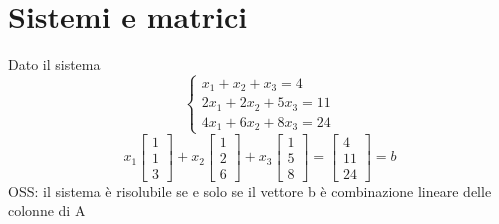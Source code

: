 \documentclass[12pt,a4paper,oneside]{article}
\begin{document}
\section{Sistemi e matrici}
\label{sec:sistemiematrici}

Dato il sistema
\[
	\begin{cases}
		x_1 + x_2 + x_3 = 4     \\
		2x_1 + 2x_2 + 5x_3 = 11 \\
		4x_1 + 6x_2 + 8x_3 = 24
	\end{cases}
\]
\[
	x_1 \begin{bmatrix} 1\\1\\3 \end{bmatrix}  + x_2 \begin{bmatrix} 1\\2\\6 \end{bmatrix} + x_3\begin{bmatrix} 1\\5\\8 \end{bmatrix} = \begin{bmatrix} 4\\11\\24 \end{bmatrix}= b
\]
OSS: il sistema è risolubile se e solo se il vettore b è combinazione lineare delle colonne di A
\end{document}
